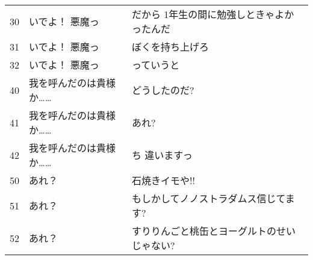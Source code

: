 \documentclass[onecolumn]{ujarticle}   %
\begin{document}
\begin{table}[tbh]
\begin{center}
\begin{tabular}{lp{5cm}p{7cm}}
      30  & いでよ！ 悪魔っ                                & だから 1年生の間に勉強しときゃよかったんだ                  \\
      31  & いでよ！ 悪魔っ                                & ぼくを持ち上げろ                                \\
      32  & いでよ！ 悪魔っ                                & っていうと                                   \\

      40  & 我を呼んだのは貴様か……                            & どうしたのだ?                                 \\
      41  & 我を呼んだのは貴様か……                            & あれ?                                     \\
      42  & 我を呼んだのは貴様か……                            & ち 違いますっ                                 \\

      50  & あれ？                                     & 石焼きイモや!!                                \\
      51  & あれ？                                     & もしかしてノノストラダムス信じてます?                     \\
      52  & あれ？                                     & すりりんごと桃缶とヨーグルトのせいじゃない?                  \\


    \end{tabular}

    \label{tab:manga}
  \end{center}
\end{table}
\end{document}
